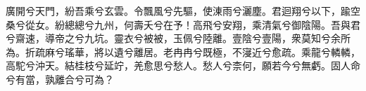 
\begin{pinyinscope}
廣開兮天門，紛吾乘兮玄雲。令飄風兮先驅，使涷雨兮灑塵。君迴翔兮以下，踰空桑兮從女。紛總總兮九州，何壽夭兮在予！高飛兮安翔，乘清氣兮御陰陽。吾與君兮齋速，導帝之兮九坑。靈衣兮被被，玉佩兮陸離。壹陰兮壹陽，衆莫知兮余所為。折疏麻兮瑤華，將以遺兮離居。老冉冉兮既極，不寖近兮愈疏。乘龍兮轔轔，高駝兮沖天。結桂枝兮延竚，羌愈思兮愁人。愁人兮柰何，願若今兮無虧。固人命兮有當，孰離合兮可為？


\end{pinyinscope}